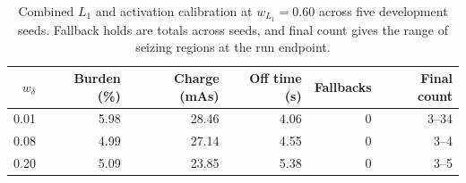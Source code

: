 \begin{table}
  \centering
  \caption{Combined \(L_1\) and activation calibration at \(w_{L_1}=0.60\) across five development seeds. Fallback holds are totals across seeds, and final count gives the range of seizing regions at the run endpoint.}\label{tab:sparse_calibration_combined}
    \begin{tabular}{@{}rrrrrr@{}}
    \toprule
    \(w_\delta\) & Burden (\%) & Charge (mAs) & Off time (s) & Fallbacks & Final count \\
    \midrule
    0.01 & 5.98 & 28.46 & 4.06 & 0 & 3--34 \\
    0.08 & 4.99 & 27.14 & 4.55 & 0 & 3--4  \\
    0.20 & 5.09 & 23.85 & 5.38 & 0 & 3--5  \\
    \bottomrule
  \end{tabular}
\end{table}
